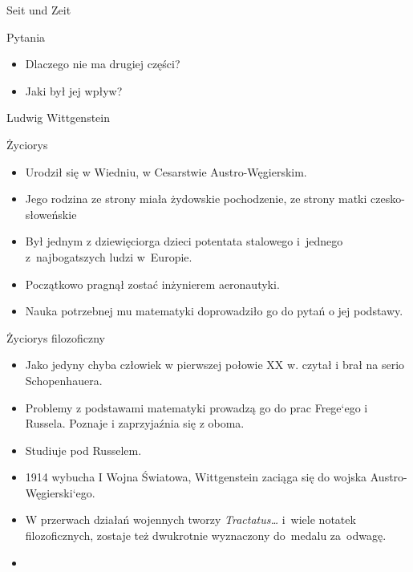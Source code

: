 \documentclass{beamer}  %
\begin{document}
\begin{frame}{Seit und Zeit}

  \begin{block}{Pytania}
    \begin{itemize}
      \pause
    \item Dlaczego nie ma drugiej części? \pause
    \item Jaki był jej wpływ?
    \end{itemize}
  \end{block}

\end{frame}



\begin{frame}{Ludwig Wittgenstein}
  \begin{block}{Życiorys}
    \begin{itemize}
    \item Urodził się w Wiedniu, w Cesarstwie Austro-Węgierskim.
    \item Jego rodzina ze strony miała żydowskie pochodzenie, ze
      strony matki czesko-słoweńskie
    \item Był jednym z dziewięciorga dzieci potentata stalowego
      i~jednego z~najbogatszych ludzi w~Europie.
    \item Początkowo pragnął zostać inżynierem aeronautyki.
    \item Nauka potrzebnej mu matematyki doprowadziło go do pytań o
      jej podstawy.
    \end{itemize}
  \end{block}

\end{frame}



\begin{frame}
  \begin{block}{Życiorys filozoficzny}
    \begin{itemize}
      \pause
    \item Jako jedyny chyba człowiek w pierwszej połowie XX w. czytał
      i brał na serio Schopenhauera.
    \item Problemy z podstawami matematyki prowadzą go do prac
      Frege`ego i Russela. Poznaje i zaprzyjaźnia się z oboma. \pause
    \item Studiuje pod Russelem. \pause
    \item 1914 wybucha I Wojna Światowa, Wittgenstein zaciąga się do
      wojska Austro-Węgierski`ego. \pause
    \item W przerwach działań wojennych tworzy \emph{Tractatus\ldots}
      i~wiele notatek filozoficznych, zostaje też dwukrotnie
      wyznaczony do~medalu za~odwagę.
    \item
    \end{itemize}
  \end{block}

\end{frame}
\end{document}

